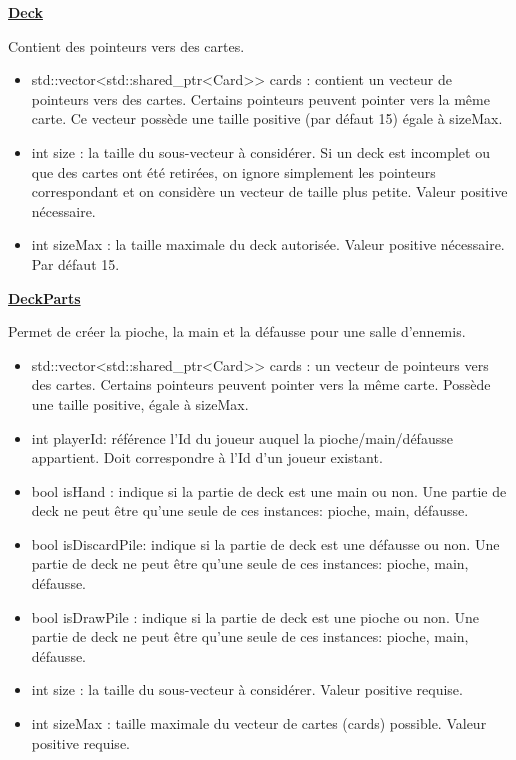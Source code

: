 \underline{\textbf{Deck}}
\par Contient des pointeurs vers des cartes.
\begin{itemize}
    \item std::vector<std::shared\_ptr<Card>> cards : contient un vecteur de pointeurs vers des cartes. Certains pointeurs peuvent pointer vers la même carte. Ce vecteur possède une taille positive (par défaut 15) égale à sizeMax.
    \item int size : la taille du sous-vecteur à considérer. Si un deck est incomplet ou que des cartes ont été retirées, on ignore simplement les pointeurs correspondant et on considère un vecteur de taille plus petite. Valeur positive nécessaire.
    \item int sizeMax : la taille maximale du deck autorisée. Valeur positive nécessaire. Par défaut 15.
\end{itemize}

\underline{\textbf{DeckParts}}
\par Permet de créer la pioche, la main et la défausse pour une salle d'ennemis.

\begin{itemize}
    \item std::vector<std::shared\_ptr<Card>> cards : un vecteur de pointeurs vers des cartes. Certains pointeurs peuvent pointer vers la même carte. Possède une taille positive, égale à sizeMax.
    \item int playerId: référence l'Id du joueur auquel la pioche/main/défausse appartient. Doit correspondre à l'Id d'un joueur existant.
    \item bool isHand : indique si la partie de deck est une main ou non. Une partie de deck ne peut être qu'une seule de ces instances: pioche, main, défausse.
    \item bool isDiscardPile: indique si la partie de deck est une défausse ou non. Une partie de deck ne peut être qu'une seule de ces instances: pioche, main, défausse.
    \item bool isDrawPile : indique si la partie de deck est une pioche ou non. Une partie de deck ne peut être qu'une seule de ces instances: pioche, main, défausse.
    \item int size : la taille du sous-vecteur à considérer. Valeur positive requise.
    \item int sizeMax : taille maximale du vecteur de cartes (cards) possible. Valeur positive requise.
\end{itemize}

